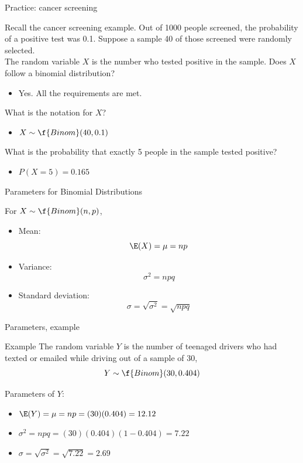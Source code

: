 \documentclass[xcolor=table]{beamer}
\begin{document}
\begin{frame}{Practice: cancer screening}
\begin{block}{}
Recall the cancer screening example. Out of 1000 people screened, the probability of a positive test was 0.1. Suppose a sample 40 of those screened were randomly selected.\\
\medskip
\pause
The random variable $X$ is the number who tested positive in the sample. Does $X$ follow a binomial distribution?
\begin{itemize}
\pause\item Yes. All the requirements are met.
\end{itemize}
\medskip
\pause
What is the notation for $X$?
\begin{itemize}
\pause\item $X \sim \f{Binom}(40, 0.1)$
\end{itemize}
\medskip
\pause
What is the probability that exactly 5 people in the sample tested positive?
\begin{itemize}
\pause\item $P(X=5) = 0.165$
\end{itemize}
\end{block}
\end{frame}


\begin{frame}{Parameters for Binomial Distributions}
\begin{block}{}
For $X \sim \f{Binom}(n,p)$,
\begin{itemize}
\pause\item Mean:
\[ \E(X) = \mu = np\]
\vspace*{-\baselineskip}\pause\item Variance:
\[\sigma^2 = npq\]
\vspace*{-\baselineskip}\pause\item Standard deviation:
\[\sigma = \sqrt{\sigma^2} = \sqrt{npq}\]
\end{itemize}
\end{block}
\end{frame}

\begin{frame}{Parameters, example}
\begin{exampleblock}{Example}
The random variable $Y$ is the number of teenaged drivers who had texted or emailed while driving out of a sample of 30,
\[Y \sim \f{Binom}(30, 0.404)\]

Parameters of $Y$:
\begin{itemize}
\pause\item $\E(Y) = \mu = np = (30)(0.404) = 12.12$
\pause\item $\sigma^2 = npq = (30)(0.404)(1-0.404) = 7.22$
\pause\item $\sigma = \sqrt{\sigma^2} = \sqrt{7.22} = 2.69$
\end{itemize}
\end{exampleblock}
\end{frame}
\end{document}
